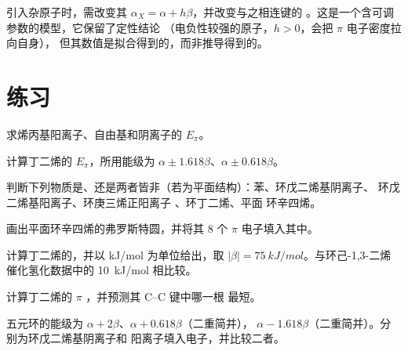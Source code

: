 引入杂原子时，需改变其 $\alpha_X = \alpha + h\beta$，并改变与之相连键的
。这是一个含可调参数的模型，它保留了定性结论
（电负性较强的原子，$h > 0$，会把 $\pi$ 电子密度拉向自身），
但其数值是拟合得到的，而非推导得到的。

\section{练习}

\begin{exercise}[$\star$]\label{exo:b2:huckel:1}
求烯丙基阳离子、自由基和阴离子的 $E_\pi$。
\end{exercise}

\begin{exercise}[$\star$]\label{exo:b2:huckel:2}
计算丁二烯的 $E_\pi$，所用能级为 $\alpha \pm 1.618\beta$、$\alpha \pm 0.618\beta$。
\end{exercise}

\begin{exercise}[$\star$]\label{exo:b2:huckel:3}
判断下列物质是、还是两者皆非（若为平面结构）：苯、环戊二烯基阴离子、
环戊二烯基阳离子、环庚三烯正阳离子 、环丁二烯、平面
环辛四烯。
\end{exercise}

\begin{exercise}[$\star$]\label{exo:b2:huckel:4}
画出平面环辛四烯的弗罗斯特圆，并将其 8 个 $\pi$ 电子填入其中。
\end{exercise}

\begin{exercise}[$\star\star$]\label{exo:b2:huckel:5}
计算丁二烯的，并以 \unit{kJ/mol} 为单位给出，取
$|\beta| = \qty{75}{kJ/mol}$。与环己-1,3-二烯催化氢化数据中的
\qty{10}{kJ/mol} 相比较。
\end{exercise}

\begin{exercise}[$\star\star$]\label{exo:b2:huckel:6}
计算丁二烯的 $\pi$ ，并预测其 C--C 键中哪一根
最短。
\end{exercise}

\begin{exercise}[$\star\star$]\label{exo:b2:huckel:7}
五元环的能级为 $\alpha + 2\beta$、$\alpha + 0.618\beta$（二重简并），
$\alpha - 1.618\beta$（二重简并）。分别为环戊二烯基阴离子和
阳离子填入电子，并比较二者。
\end{exercise}

